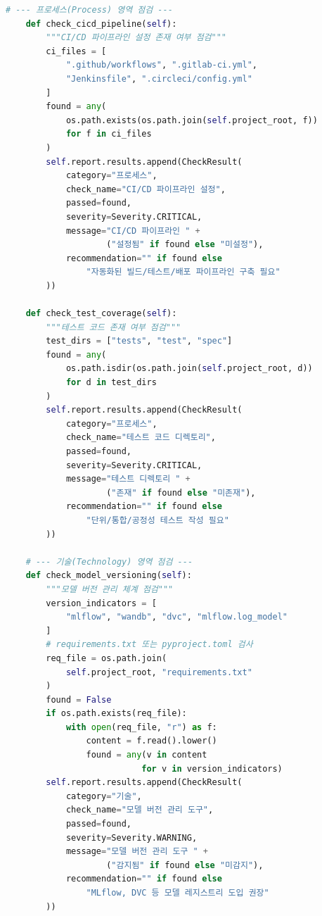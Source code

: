 \begin{lstlisting}[language=Python, caption={AI 거버넌스 Health Check 자동화 도구}, label={lst:governance_health_check}]
    # --- 프로세스(Process) 영역 점검 ---
    def check_cicd_pipeline(self):
        """CI/CD 파이프라인 설정 존재 여부 점검"""
        ci_files = [
            ".github/workflows", ".gitlab-ci.yml",
            "Jenkinsfile", ".circleci/config.yml"
        ]
        found = any(
            os.path.exists(os.path.join(self.project_root, f))
            for f in ci_files
        )
        self.report.results.append(CheckResult(
            category="프로세스",
            check_name="CI/CD 파이프라인 설정",
            passed=found,
            severity=Severity.CRITICAL,
            message="CI/CD 파이프라인 " +
                    ("설정됨" if found else "미설정"),
            recommendation="" if found else
                "자동화된 빌드/테스트/배포 파이프라인 구축 필요"
        ))

    def check_test_coverage(self):
        """테스트 코드 존재 여부 점검"""
        test_dirs = ["tests", "test", "spec"]
        found = any(
            os.path.isdir(os.path.join(self.project_root, d))
            for d in test_dirs
        )
        self.report.results.append(CheckResult(
            category="프로세스",
            check_name="테스트 코드 디렉토리",
            passed=found,
            severity=Severity.CRITICAL,
            message="테스트 디렉토리 " +
                    ("존재" if found else "미존재"),
            recommendation="" if found else
                "단위/통합/공정성 테스트 작성 필요"
        ))

    # --- 기술(Technology) 영역 점검 ---
    def check_model_versioning(self):
        """모델 버전 관리 체계 점검"""
        version_indicators = [
            "mlflow", "wandb", "dvc", "mlflow.log_model"
        ]
        # requirements.txt 또는 pyproject.toml 검사
        req_file = os.path.join(
            self.project_root, "requirements.txt"
        )
        found = False
        if os.path.exists(req_file):
            with open(req_file, "r") as f:
                content = f.read().lower()
                found = any(v in content
                           for v in version_indicators)
        self.report.results.append(CheckResult(
            category="기술",
            check_name="모델 버전 관리 도구",
            passed=found,
            severity=Severity.WARNING,
            message="모델 버전 관리 도구 " +
                    ("감지됨" if found else "미감지"),
            recommendation="" if found else
                "MLflow, DVC 등 모델 레지스트리 도입 권장"
        ))


\end{lstlisting}

